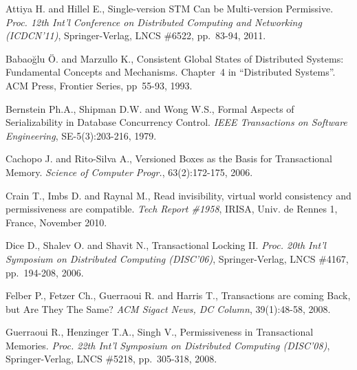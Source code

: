 \begin{thebibliography}{99}
\small{

%


Attiya  H. and Hillel E.,
Single-version STM Can be Multi-version Permissive. 
{\it Proc. 12th Int'l Conference on Distributed Computing and Networking
(ICDCN'11)}, Springer-Verlag, LNCS \#6522, pp.~83-94, 2011.



Babao\u{g}lu \"{O}. and Marzullo K., 
Consistent Global States of Distributed Systems: Fundamental
Concepts and Mechanisms. Chapter~4 in ``Distributed Systems''.  
ACM Press, Frontier Series,  pp~55-93, 1993.


Bernstein Ph.A., Shipman D.W. and Wong W.S., 
Formal Aspects of Serializability in Database Concurrency Control. 
{\it IEEE Transactions on Software Engineering}, SE-5(3):203-216, 1979. 



Cachopo J. and Rito-Silva A., 
Versioned Boxes as the Basis for Transactional Memory. 
{\it Science of Computer Progr.}, 63(2):172-175, 2006. 


Crain T., Imbs D. and Raynal M.,
Read invisibility, virtual world consistency and  permissiveness
are compatible.
{\it Tech Report \#1958}, IRISA, Univ. de  Rennes 1, France, November 2010. 



Dice D., Shalev O. and Shavit N.,
Transactional Locking II.
{\em Proc. 20th Int'l Symposium on Distributed Computing (DISC'06)},
Springer-Verlag, LNCS \#4167, pp.~194-208, 2006.



Felber P., Fetzer Ch., Guerraoui R. and Harris T., 
Transactions are coming Back, but Are They The Same?
{\it ACM Sigact News, DC Column}, 39(1):48-58, 2008.





Guerraoui R., Henzinger T.A., Singh V.,
Permissiveness  in Transactional Memories. 
{\em Proc. 22th Int'l Symposium on Distributed Computing (DISC'08)},
Springer-Verlag, LNCS \#5218, pp.~305-318, 2008.



}
\end{thebibliography}
